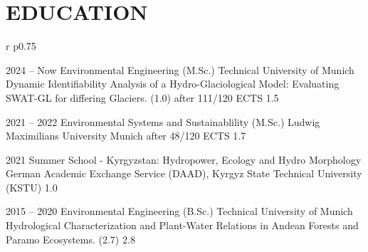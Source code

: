 
\section{EDUCATION} 





\begin{supertabular}{r p{0.75\linewidth}} %

	
	\hspace{-12pt}\qualificationentry
		{2024 -- Now} %
		{Environmental Engineering (M.Sc.)} %
		{Technical University of Munich} %
		{Dynamic Identifiability Analysis of a Hydro-Glaciological Model: Evaluating SWAT-GL for differing Glaciers. (1.0)} %
		{after 111/120 ECTS   1.5} %
	
	
	\hspace{-12pt}\qualificationentry
		{2021 -- 2022} %
		{Environmental Systems and
		Sustainablility (M.Sc.)} %
		{Ludwig Maximilians University Munich} %
		{} %
		{after 48/120 ECTS   1.7} %
	
		\hspace{-12pt}\qualificationentry
		{2021} %
		{Summer School - Kyrgyzstan: Hydropower, Ecology and Hydro Morphology} %
		{German Academic Exchange Service (DAAD), Kyrgyz State Technical University (KSTU)} %
		{} %
		{1.0} %
	
	
	\hspace{-12pt}\qualificationentry
		{2015 -- 2020} %
		{Environmental Engineering (B.Sc.)} %
		{Technical University of Munich} %
		{Hydrological Characterization and Plant-Water Relations in Andean Forests and Paramo Ecosystems. (2.7)} %
		{2.8} %
	

\end{supertabular}